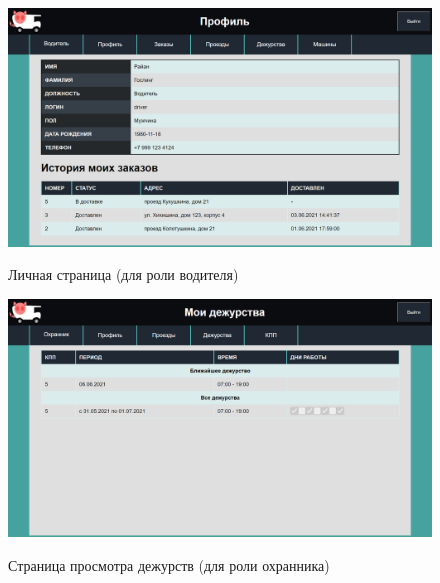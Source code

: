 \begin{figure}[h!] 
	\begin{center}
		{\includegraphics[scale=0.4, angle=0]{sc/driver_profile}}
		\caption{Личная страница (для роли водителя)}
		\label{driver_profile_sc}
	\end{center}
\end{figure}

\begin{figure}[h!] 
	\begin{center}
		{\includegraphics[scale=0.4, angle=0]{sc/guard_duty}}
		\caption{Страница просмотра дежурств (для роли охранника)}
		\label{guard_duty_sc}
	\end{center}
\end{figure}

